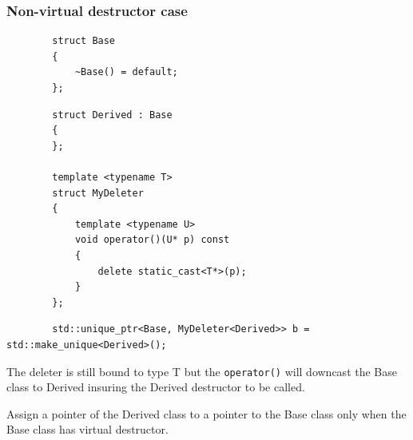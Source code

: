 \documentclass{beamer}
\begin{document}
\begin{frame}[fragile,t]
\frametitle{Non-virtual destructor case}
	\begin{lstlisting}
		struct Base
		{
			~Base() = default;
		};
	\end{lstlisting}
	\begin{lstlisting}	
		struct Derived : Base
		{
		};	

		template <typename T>
		struct MyDeleter
		{
		    template <typename U>
		    void operator()(U* p) const
		    {
		        delete static_cast<T*>(p);
		    }
		};
	\end{lstlisting}
			
    \hrulefill
	\begin{lstlisting}	
		std::unique_ptr<Base, MyDeleter<Derived>> b = std::make_unique<Derived>();
	\end{lstlisting}
    \hrulefill \newline
	The deleter is still bound to type T but the \texttt{operator()} will downcast
	the Base class to Derived insuring the Derived destructor to be called.
\end{frame}

\begin{frame}
    \begin{center}
		Assign a pointer of the Derived class to a pointer to the Base class 
		only when the Base class has virtual destructor.
    \end{center}
\end{frame}
\end{document}
